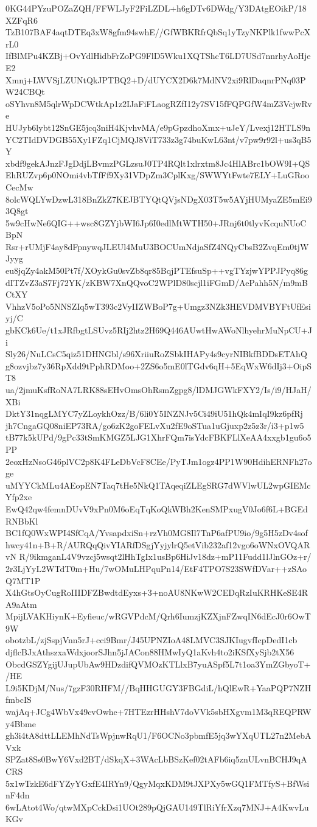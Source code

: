 0KG44PYzuPOZaZQH/FFWLJyF2FiLZDL+h6gDTv6DWdg/Y3DAtgEOikP/18XZFqR6
TzB107BAF4aqtDTEq3xW8gfm94swhE//GfWBKRfrQbSq1yTzyNKPlk1fwwPcXrL0
IfBlMPu4KZBj+OvYdlHidbFrZoPG9FlD5Wku1XQTShcT6LD7USd7nnrhyAoHjeE2
Xmnj+LWVSjLZUNtQkJPTBQ2+D/dUYCX2D6k7MdNV2xi9RlDaqnrPNq03PW24CBQt
oSYhvn8M5qlrWpDCWtkAp1z2IJaFiFLaogRZfI12y7SV15fFQPGfW4mZ3VcjwRve
HUJyb6lybt12SnGE5jcq3niH4KjvhvMA/e9pGpzdhoXmx+uJeY/Lvexj12HTLS9n
YC2TIdDVDGB55Xy1FZq1CjMQJ8ViT733z3g74buKwL63nt/v7pw9r92l+us3qB5Y
xbdf9gekAJnzFJgDdjLBvmzPGLzsuJ0TP4RQlt1xlrxtm8Jc4HlABrc1bOW9I+QS
EhRUZvp6p0NOmi4vbTfFf9Xy31VDpZm3CplKxg/SWWYtFwte7ELY+LuGRooCecMw
8olcWQLYwDzwL318BnZkZ7KEJBTYQtQVjsNDgX03T5w5AYjHUMyaZE5mEi93Q8gt
5w9cHwNe6QIG++wsc8GZYjbWI6Jp6I0edlMtWTH50+JRnj6t0tlyvKcquNUoCBpN
Rsr+rUMjF4ay8dFpnywqJLEUl4MuU3BOCUmNdjaSfZ4NQyCbsB2ZvqEm0tjWJyyg
eu8jqZy4akM50Pt7f/XOykGu0svZb8qr85BqjPTEfsuSp++vgTYzjwYPPJPyq86g
dITZvZ3aS7Fj72YK/zKBW7XnQQvoC2WPlD80scjl1iFGmD/AePahh5N/m9mBCtXY
VhhzV5oPo5NNSZIq5wT393c2VyIIZWBoP7g+Umgz3NZk3HEVDMVBYFtUfEsiyj/C
gbKCk6Ue/t1xJRfbgtLSUvz5RIj2htz2H69Q446AUwtHwAWoNlhyehrMuNpCU+Ji
Sly26/NuLCsC5qiz51DHNGbl/s96XriiuRoZSbkIHAPy4s9cyrNIBkfBDDsETAhQ
g8ozvjbz7y36RpXdd9tPphRDMoo+2ZS6o5mE0lTGdv6qH+5EqWxW6dIj3+OipST8
ua/2jmuKsfRoNA7LRK88sEHvOmsOhRsmZgpg8/lDMJGWkFXY2/Is/i9/HJaH/XBi
DktY31nqgLMYC7yZLoykhOzz/B/6li0Y5INZNJv5Ci49iU51hQk4mIqI9kz6pfRj
jh7CngaGQ08niEP73RA/go6zK2goFELvXu2fE9oSTua1uGjuxp2z5z3r/i3+p1w5
tB77k5kUPd/9gPc33tSmKMGZ5LJG1XhrFQm7isYdcFBKFLlXeAA4xxgb1gu6o5PP
2eoxHzNsoG46plVC2p8K4FLeDbVcF8CEe/PyTJm1ogz4PP1W90HdihERNFh27oge
uMYYCkMLu4AEopEN7Taq7tHe5NkQ1TAqeqiZLEgSRG7dWVlwUL2wpGIEMcYfp2xe
EwQ42qw4femnDUvV9xPn0M6oEqTqKoQkWBh2KenSMPxugV0Jo6f6L+BGEdRNBbKl
BC1fQ0WxWPI4SfCqA/YvsapdxiSn+rzVh0MG8Il7TnP6afPU9io/9g5H5zDv4sof
hwcy41n+B+R/AURQqQivYIARfDSgjYyjylrQ5etVib232af12vgo6oWNxOVQARvN
R/9ikmganL4V9vzcj5wsqt2lHhTgIx1usBp6HiJv18dz+mP11Fudd1lJlnGOz+r/
2r3LjYyL2WTdT0m+Hu/7wOMuLHPquPn14/EtF4TPO7S23SWfDVar++zSAoQ7MT1P
X4hGtsOyCugRoIIIDFZBwdtdEyxs+3+noAU8NKwW2CEDqRzIuKRHKeSE4RA9aAtm
MpijLVAKHiynK+Eyfieuc/wRGVPdcM/Qrh6IumzjKZXjnFZwqIN6dEcJ0r6OwT9W
obotzbL/zjSspjVnn5rJ+cci9Bmr/J45UPNZIoA48LMVC3SJKIugvfIcpDedI1cb
djflcBJxAthszxaWdxjoorSJhn5jJACon88HMwIyQ1aKvh4to2iKSfXySjb2tX56
ObcdGSZYgijUJupUbAw9HDzdifQVMOzKTLlxB7yuASpf5L7t1oa3YmZGbyoT+/HE
L9i5KDjM/Nus/7gzF30RHFM//BqHHGUGY3FBGdiL/hQlEwR+YaaPQP7NZHfmbcIS
wajAq+JCg4WbVx49cvOwhe+7HTEzrHHshV7doVVk5sbHXgvm1M3qREQPRWy4Bbme
gh3i4tA8dttLLEMhNdTsWpjnwRqU1/F6OCNo3pbmfE5jq3wYXqUTL27n2MebAVxk
SPZat8Ss0BwY6Vxd2BT/dSkqX+3WAcLbBSzKef02tAFb6iq5znULvnBCHJ9qACRS
5x1wTzkE6dFYZyYGxfE4IRYn9/QgyMqxKDM9tJXPXy5wGQ1FMTfyS+BfWsinF4dn
6wLAtot4Wo/qtwMXpCckDsi1UOt289pQjGAU149TlRiYfrXzq7MNJ+A4KwvLuKGv
